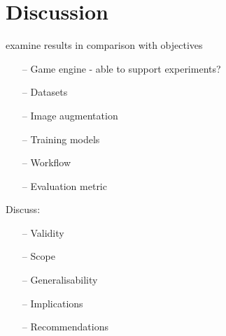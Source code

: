
\chapter{Discussion}

\label{Discussion} 


  



examine results in comparison with objectives
\begin{itemize}
    \item[--] Game engine - able to support experiments?
    \item[--] Datasets
    \item[--] Image augmentation
    \item[--] Training models
    \item[--] Workflow
    \item[--] Evaluation metric
\end{itemize}
Discuss:
\begin{itemize}
    \item[--] Validity
    \item[--] Scope
    \item[--] Generalisability
    \item[--] Implications
    \item[--] Recommendations
\end{itemize}